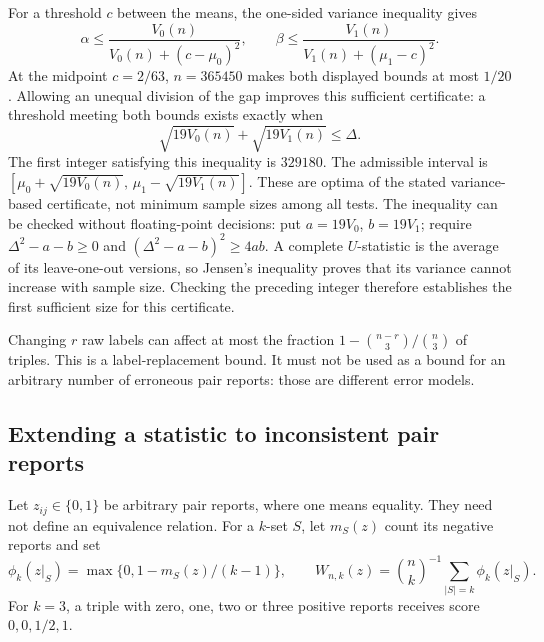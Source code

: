 For a threshold $c$ between the means, the one-sided variance inequality gives
\begin{equation}
 \alpha\le\frac{V_0(n)}{V_0(n)+(c-\mu_0)^2},\qquad
 \beta\le\frac{V_1(n)}{V_1(n)+(\mu_1-c)^2}.
 \label{sam:cantelli}
\end{equation}
At the midpoint $c=2/63$, $n=365450$ makes both displayed bounds at most $1/20$. Allowing an unequal division of the gap improves this sufficient certificate: a threshold meeting both bounds exists exactly when
\[
 \sqrt{19V_0(n)}+\sqrt{19V_1(n)}\le\Delta.
\]
The first integer satisfying this inequality is $329180$. The admissible interval is
$[\mu_0+\sqrt{19V_0(n)},\,\mu_1-\sqrt{19V_1(n)}]$.
These are optima of the stated variance-based certificate, not minimum sample sizes among all tests. The inequality can be checked without floating-point decisions: put $a=19V_0$, $b=19V_1$; require $\Delta^2-a-b\ge0$ and $(\Delta^2-a-b)^2\ge4ab$. A complete $U$-statistic is the average of its leave-one-out versions, so Jensen's inequality proves that its variance cannot increase with sample size. Checking the preceding integer therefore establishes the first sufficient size for this certificate.

Changing $r$ raw labels can affect at most the fraction
$1-\binom{n-r}{3}/\binom n3$ of triples. This is a label-replacement bound. It must not be used as a bound for an arbitrary number of erroneous pair reports: those are different error models.

\subsection{Extending a statistic to inconsistent pair reports}
\label{sam:extension}
Let $z_{ij}\in\{0,1\}$ be arbitrary pair reports, where one means equality. They need not define an equivalence relation. For a $k$-set $S$, let $m_S(z)$ count its negative reports and set
\[
 \phi_k(z|_S)=\max\{0,1-m_S(z)/(k-1)\},\qquad
 W_{n,k}(z)=\binom nk^{-1}\sum_{|S|=k}\phi_k(z|_S).
\]
For $k=3$, a triple with zero, one, two or three positive reports receives score $0,0,1/2,1$.

